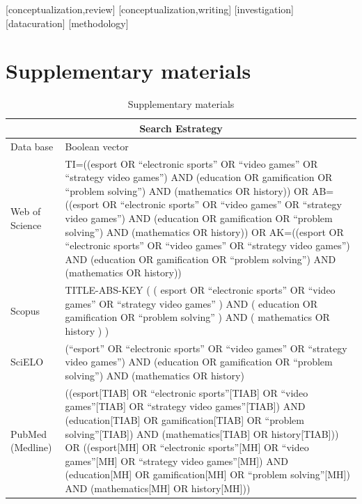 \documentclass[english]{textolivre}
\begin{document}
\printbibliography\label{sec-bib}
\begin{contributors}
[conceptualization,review]
[conceptualization,writing]
[investigation]
[datacuration]
[methodology]
\end{contributors}

\appendix

\section{Supplementary materials}

\begin{table}[h!]
\centering
\begin{threeparttable}
\caption{Supplementary materials}
\label{annex-tab01}
\begin{tabular}{p{3cm} p{10cm}}
\toprule
\multicolumn{2}{c}{Search Estrategy} \\
\midrule
Data base & Boolean vector \\
Web of Science & TI=((esport OR “electronic sports” OR “video games” OR “strategy video games”) AND (education OR gamification OR “problem solving”) AND (mathematics OR history)) OR AB=((esport OR “electronic sports” OR “video games” OR “strategy video games”) AND (education OR gamification OR “problem solving”) AND (mathematics OR history)) OR AK=((esport OR “electronic sports” OR “video games” OR “strategy video games”) AND (education OR gamification OR “problem solving”) AND (mathematics OR history)) \\
Scopus & TITLE-ABS-KEY ( ( esport OR “electronic sports” OR “video games” OR “strategy video games” ) AND ( education OR gamification OR “problem solving” ) AND ( mathematics OR history ) ) \\
SciELO & (“esport” OR “electronic sports” OR “video games” OR “strategy video games”) AND (education OR gamification OR “problem solving”) AND (mathematics OR history) \\
PubMed (Medline) & ((esport[TIAB] OR “electronic sports”[TIAB] OR “video games”[TIAB] OR “strategy video games”[TIAB]) AND (education[TIAB] OR gamification[TIAB] OR “problem solving”[TIAB]) AND (mathematics[TIAB] OR history[TIAB])) OR ((esport[MH] OR “electronic sports”[MH] OR “video games”[MH] OR “strategy video games”[MH]) AND (education[MH] OR gamification[MH] OR “problem solving”[MH]) AND (mathematics[MH] OR history[MH])) \\
\bottomrule
\end{tabular}
\end{threeparttable}
\end{table}
\end{document}
